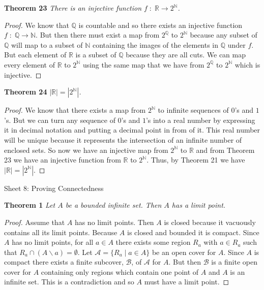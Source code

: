 \documentclass{article}
\begin{document}
\begin{flushleft}
\textbf{Theorem 23}
\textsl{There is an injective function $f \; : \; \mathbb{R} \rightarrow 2^{\mathbb{N}}$.}
\begin{proof}
We know that $\mathbb{Q}$ is countable and so there exists an injective function $f \; : \; \mathbb{Q} \rightarrow \mathbb{N}$. But then there must exist a map from $2^{\mathbb{Q}}$ to $2^{\mathbb{N}}$ because any subset of $\mathbb{Q}$ will map to a subset of $\mathbb{N}$ containing the images of the elements in $\mathbb{Q}$ under $f$. But each element of $\mathbb{R}$ is a subset of $\mathbb{Q}$ because they are all cuts. We can map every element of $\mathbb{R}$ to $2^{\mathbb{N}}$ using the same map that we have from $2^{\mathbb{Q}}$ to $2^{\mathbb{N}}$ which is injective.
\end{proof}

\textbf{Theorem 24}
\textsl{$|\mathbb{R}|=|2^{\mathbb{N}}|$.}
\begin{proof}
We know that there exists a map from $2^{\mathbb{N}}$ to infinite sequences of $0$'s and $1$'s. But we can turn any sequence of $0$'s and $1$'s into a real number by expressing it in decimal notation and putting a decimal point in from of it. This real number will be unique because it represents the intersection of an infinite number of enclosed sets. So now we have an injective map from $2^{\mathbb{N}}$ to $\mathbb{R}$ and from Theorem 23 we have an injective function from $\mathbb{R}$ to $2^{\mathbb{N}}$. Thus, by Theorem 21 we have $|\mathbb{R}| = |2^{\mathbb{N}}|$.
\end{proof}

\newpage

\Large

Sheet 8: Proving Connectedness\newline

\normalsize

\textbf{Theorem 1}
\textsl{Let $A$ be a bounded infinite set. Then $A$ has a limit point.}
\begin{proof}
Assume that $A$ has no limit points. Then $A$ is closed because it vacuously contains all its limit points. Because $A$ is closed and bounded it is compact. Since $A$ has no limit points, for all $a \in A$ there exists some region $R_a$ with $a \in R_a$ such that $R_a \cap (A \backslash a) = \emptyset$. Let $\mathcal{A} = \{R_a \mid a \in A\}$ be an open cover for $A$. Since $A$ is compact there exists a finite subcover, $\mathcal{B}$, of $\mathcal{A}$ for $A$. But then $\mathcal{B}$ is a finite open cover for $A$ containing only regions which contain one point of $A$ and $A$ is an infinite set. This is a contradiction and so $A$ must have a limit point.
\end{proof}


\end{flushleft}
\end{document}

